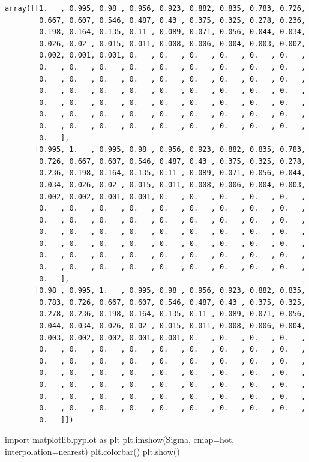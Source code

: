\documentclass[
  letterpaper,
  DIV=11,
  numbers=noendperiod]{scrreprt}
\newenvironment{Shaded}{\begin{snugshade}}{\end{snugshade}}
\newcommand{\ImportTok}[1]{\textcolor[rgb]{0.00,0.46,0.62}{#1}}
\newcommand{\NormalTok}[1]{\textcolor[rgb]{0.00,0.23,0.31}{#1}}
\newcommand{\OperatorTok}[1]{\textcolor[rgb]{0.37,0.37,0.37}{#1}}
\newcommand{\StringTok}[1]{\textcolor[rgb]{0.13,0.47,0.30}{#1}}
\begin{document}
\begin{verbatim}
array([[1.   , 0.995, 0.98 , 0.956, 0.923, 0.882, 0.835, 0.783, 0.726,
        0.667, 0.607, 0.546, 0.487, 0.43 , 0.375, 0.325, 0.278, 0.236,
        0.198, 0.164, 0.135, 0.11 , 0.089, 0.071, 0.056, 0.044, 0.034,
        0.026, 0.02 , 0.015, 0.011, 0.008, 0.006, 0.004, 0.003, 0.002,
        0.002, 0.001, 0.001, 0.   , 0.   , 0.   , 0.   , 0.   , 0.   ,
        0.   , 0.   , 0.   , 0.   , 0.   , 0.   , 0.   , 0.   , 0.   ,
        0.   , 0.   , 0.   , 0.   , 0.   , 0.   , 0.   , 0.   , 0.   ,
        0.   , 0.   , 0.   , 0.   , 0.   , 0.   , 0.   , 0.   , 0.   ,
        0.   , 0.   , 0.   , 0.   , 0.   , 0.   , 0.   , 0.   , 0.   ,
        0.   , 0.   , 0.   , 0.   , 0.   , 0.   , 0.   , 0.   , 0.   ,
        0.   , 0.   , 0.   , 0.   , 0.   , 0.   , 0.   , 0.   , 0.   ,
        0.   ],
       [0.995, 1.   , 0.995, 0.98 , 0.956, 0.923, 0.882, 0.835, 0.783,
        0.726, 0.667, 0.607, 0.546, 0.487, 0.43 , 0.375, 0.325, 0.278,
        0.236, 0.198, 0.164, 0.135, 0.11 , 0.089, 0.071, 0.056, 0.044,
        0.034, 0.026, 0.02 , 0.015, 0.011, 0.008, 0.006, 0.004, 0.003,
        0.002, 0.002, 0.001, 0.001, 0.   , 0.   , 0.   , 0.   , 0.   ,
        0.   , 0.   , 0.   , 0.   , 0.   , 0.   , 0.   , 0.   , 0.   ,
        0.   , 0.   , 0.   , 0.   , 0.   , 0.   , 0.   , 0.   , 0.   ,
        0.   , 0.   , 0.   , 0.   , 0.   , 0.   , 0.   , 0.   , 0.   ,
        0.   , 0.   , 0.   , 0.   , 0.   , 0.   , 0.   , 0.   , 0.   ,
        0.   , 0.   , 0.   , 0.   , 0.   , 0.   , 0.   , 0.   , 0.   ,
        0.   , 0.   , 0.   , 0.   , 0.   , 0.   , 0.   , 0.   , 0.   ,
        0.   ],
       [0.98 , 0.995, 1.   , 0.995, 0.98 , 0.956, 0.923, 0.882, 0.835,
        0.783, 0.726, 0.667, 0.607, 0.546, 0.487, 0.43 , 0.375, 0.325,
        0.278, 0.236, 0.198, 0.164, 0.135, 0.11 , 0.089, 0.071, 0.056,
        0.044, 0.034, 0.026, 0.02 , 0.015, 0.011, 0.008, 0.006, 0.004,
        0.003, 0.002, 0.002, 0.001, 0.001, 0.   , 0.   , 0.   , 0.   ,
        0.   , 0.   , 0.   , 0.   , 0.   , 0.   , 0.   , 0.   , 0.   ,
        0.   , 0.   , 0.   , 0.   , 0.   , 0.   , 0.   , 0.   , 0.   ,
        0.   , 0.   , 0.   , 0.   , 0.   , 0.   , 0.   , 0.   , 0.   ,
        0.   , 0.   , 0.   , 0.   , 0.   , 0.   , 0.   , 0.   , 0.   ,
        0.   , 0.   , 0.   , 0.   , 0.   , 0.   , 0.   , 0.   , 0.   ,
        0.   , 0.   , 0.   , 0.   , 0.   , 0.   , 0.   , 0.   , 0.   ,
        0.   ]])
\end{verbatim}

\begin{Shaded}
\begin{Highlighting}[]
\ImportTok{import}\NormalTok{ matplotlib.pyplot }\ImportTok{as}\NormalTok{ plt}
\NormalTok{plt.imshow(Sigma, cmap}\OperatorTok{=}\StringTok{\textquotesingle{}hot\textquotesingle{}}\NormalTok{, interpolation}\OperatorTok{=}\StringTok{\textquotesingle{}nearest\textquotesingle{}}\NormalTok{)}
\NormalTok{plt.colorbar()}
\NormalTok{plt.show()}
\end{Highlighting}
\end{Shaded}
\end{document}
